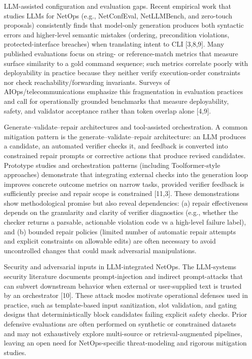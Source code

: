 \documentclass[conference]{IEEEtran}
\begin{document}
LLM-assisted configuration and evaluation gaps. Recent empirical work that studies LLMs for NetOps (e.g., NetConfEval, NetLLMBench, and zero-touch proposals) consistently finds that model-only generation produces both syntactic errors and higher-level semantic mistakes (ordering, precondition violations, protected-interface breaches) when translating intent to CLI [3,8,9]. Many published evaluations focus on string- or reference-match metrics that measure surface similarity to a gold command sequence; such metrics correlate poorly with deployability in practice because they neither verify execution-order constraints nor check reachability/forwarding invariants. Surveys of AIOps/telecommunications emphasize this fragmentation in evaluation practices and call for operationally grounded benchmarks that measure deployability, safety, and validator acceptance rather than token overlap alone [4,9].

Generate--validate--repair architectures and tool-assisted orchestration. A common mitigation pattern is the generate--validate--repair architecture: an LLM produces a candidate, an automated verifier checks it, and feedback is converted into constrained repair prompts or corrective actions that produce revised candidates. Prototype studies and orchestration patterns (including Toolformer-style approaches) demonstrate that integrating external checks into the generation loop improves concrete outcome metrics on narrow tasks, provided verifier feedback is sufficiently precise and repair scope is constrained [11,3]. These demonstrations show methodological promise but also reveal dependencies: (a) repair effectiveness depends on the granularity and clarity of verifier diagnostics (e.g., whether the checker returns a parsable, actionable violation code vs a high-level failure label), and (b) bounded repair policies (limited number of automatic repair attempts and explicit constraints on allowable edits) are often necessary to avoid uncontrolled changes that could mask adversarial manipulations.

Security and adversarial inputs in LLM-integrated NetOps. The LLM-systems security literature documents prompt-injection and indirect prompt-attacks that can subvert downstream behavior when external or user-supplied text is trusted by an orchestrator [10]. These attack modes motivate operational defenses used in practice, such as template-based input sanitization, slot validation, and gating designs that deterministically block candidates failing explicit safety checks. Prior defensive evaluations are often performed on synthetic or constrained datasets and may not exhaustively explore multi-source or retrieval-augmented pipelines, leaving an open need for NetOps-specific threat-modeling and rigorous mitigation studies.
\end{document}
